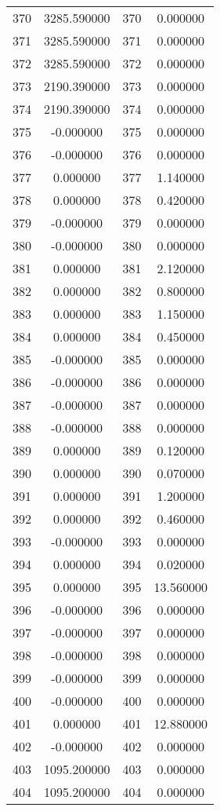 \documentclass[12pt]{article}
\begin{document}
\begin{longtable}{@{}cccc@{}}
370 & 3285.590000 & 370 & 0.000000 \\
371 & 3285.590000 & 371 & 0.000000 \\
372 & 3285.590000 & 372 & 0.000000 \\
373 & 2190.390000 & 373 & 0.000000 \\
374 & 2190.390000 & 374 & 0.000000 \\
375 & -0.000000 & 375 & 0.000000 \\
376 & -0.000000 & 376 & 0.000000 \\
377 & 0.000000 & 377 & 1.140000 \\
378 & 0.000000 & 378 & 0.420000 \\
379 & -0.000000 & 379 & 0.000000 \\
380 & -0.000000 & 380 & 0.000000 \\
381 & 0.000000 & 381 & 2.120000 \\
382 & 0.000000 & 382 & 0.800000 \\
383 & 0.000000 & 383 & 1.150000 \\
384 & 0.000000 & 384 & 0.450000 \\
385 & -0.000000 & 385 & 0.000000 \\
386 & -0.000000 & 386 & 0.000000 \\
387 & -0.000000 & 387 & 0.000000 \\
388 & -0.000000 & 388 & 0.000000 \\
389 & 0.000000 & 389 & 0.120000 \\
390 & 0.000000 & 390 & 0.070000 \\
391 & 0.000000 & 391 & 1.200000 \\
392 & 0.000000 & 392 & 0.460000 \\
393 & -0.000000 & 393 & 0.000000 \\
394 & 0.000000 & 394 & 0.020000 \\
395 & 0.000000 & 395 & 13.560000 \\
396 & -0.000000 & 396 & 0.000000 \\
397 & -0.000000 & 397 & 0.000000 \\
398 & -0.000000 & 398 & 0.000000 \\
399 & -0.000000 & 399 & 0.000000 \\
400 & -0.000000 & 400 & 0.000000 \\
401 & 0.000000 & 401 & 12.880000 \\
402 & -0.000000 & 402 & 0.000000 \\
403 & 1095.200000 & 403 & 0.000000 \\
404 & 1095.200000 & 404 & 0.000000 \\

\end{longtable}
\end{document}
